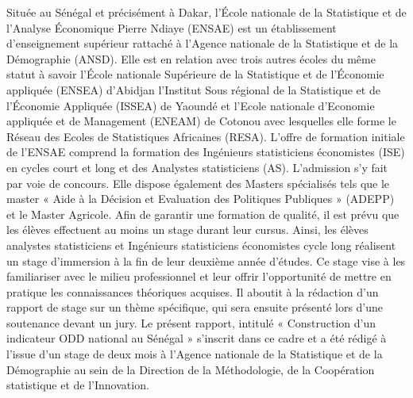 Située au Sénégal et précisément à Dakar, l’École nationale de la Statistique et de
l’Analyse Économique Pierre Ndiaye (ENSAE) est un établissement d’enseignement
supérieur rattaché à l’Agence nationale de la Statistique et de la Démographie
(ANSD). Elle est en relation avec trois autres écoles du même statut à savoir
l’École nationale Supérieure de la Statistique et de l’Économie appliquée (ENSEA)
d’Abidjan l’Institut Sous régional de la Statistique et de l’Économie Appliquée
(ISSEA) de Yaoundé et l’Ecole nationale d’Economie appliquée et de Management
(ENEAM) de Cotonou avec lesquelles elle forme le Réseau des Ecoles de Statistiques
Africaines (RESA).
L’offre de formation initiale de l’ENSAE comprend la formation des Ingénieurs
statisticiens économistes (ISE) en cycles court et long et des Analystes statisticiens (AS). L’admission s’y fait par voie de concours. Elle dispose également des Masters spécialisés tels que le master « Aide à la Décision et Evaluation des Politiques Publiques » (ADEPP) et le Master Agricole.
Afin de garantir une formation de qualité, il est prévu que les élèves effectuent au moins un stage durant leur cursus. Ainsi, les élèves analystes statisticiens et Ingénieurs statisticiens économistes cycle long réalisent un stage d’immersion à la fin de leur deuxième année d’études. Ce stage vise à les familiariser avec le milieu professionnel et leur offrir l’opportunité de mettre en pratique les connaissances théoriques acquises. Il aboutit à la rédaction d’un rapport de stage sur un thème 
spécifique, qui sera ensuite présenté lors d'une soutenance devant un jury.
Le présent rapport, intitulé « Construction d'un indicateur ODD national au Sénégal » s’inscrit dans ce cadre et a été rédigé à l’issue d’un stage de deux mois à l’Agence nationale de la Statistique et de la Démographie au sein de la Direction de la Méthodologie, de la Coopération statistique et de l'Innovation.

